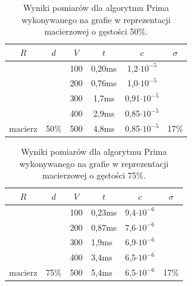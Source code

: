 \documentclass[a4paper,12pt]{article}
\begin{document}
\begin{table}[H]
	\centering
	\caption{\centering Wyniki pomiarów dla algorytmu Prima wykonywanego na grafie w reprezentacji macierzowej o gęstości 50\%.}
	\begin{tabular}{|c|c|c|c|c|c|}
		\hline
		\rowcolor[HTML]{C0C0C0} 
		$R$                       & $d$                    & $V$ & $t$    & $c$                 & $\sigma$               \\ \hline
		&                        & 100 & 0,20ms & 1,2$\cdot 10^{-5}$  &                        \\ \cline{3-5}
		&                        & 200 & 0,76ms & 1,0$\cdot 10^{-5}$  &                        \\ \cline{3-5}
		&                        & 300 & 1,7ms  & 0,91$\cdot 10^{-5}$ &                        \\ \cline{3-5}
		&                        & 400 & 2,9ms  & 0,85$\cdot 10^{-5}$ &                        \\ \cline{3-5}
		\multirow{-5}{*}{macierz} & \multirow{-5}{*}{50\%} & 500 & 4,8ms  & 0,85$\cdot 10^{-5}$ & \multirow{-5}{*}{17\%} \\ \hline
	\end{tabular}
\end{table}

\begin{table}[H]
	\centering
	\caption{\centering Wyniki pomiarów dla algorytmu Prima wykonywanego na grafie w reprezentacji macierzowej o gęstości 75\%.}
	\begin{tabular}{|c|c|c|l|c|c|}
		\hline
		\rowcolor[HTML]{C0C0C0} 
		$R$                       & $d$                    & $V$ & \multicolumn{1}{c|}{\cellcolor[HTML]{C0C0C0}$t$} & $c$                & $\sigma$               \\ \hline
		&                        & 100 & 0,23ms                                           & 9,4$\cdot 10^{-6}$ &                        \\ \cline{3-5}
		&                        & 200 & 0,87ms                                           & 7,6$\cdot 10^{-6}$ &                        \\ \cline{3-5}
		&                        & 300 & 1,9ms                                            & 6,9$\cdot 10^{-6}$ &                        \\ \cline{3-5}
		&                        & 400 & 3,4ms                                            & 6,5$\cdot 10^{-6}$ &                        \\ \cline{3-5}
		\multirow{-5}{*}{macierz} & \multirow{-5}{*}{75\%} & 500 & 5,4ms                                            & 6,5$\cdot 10^{-6}$ & \multirow{-5}{*}{17\%} \\ \hline
	\end{tabular}
\end{table}
\end{document}
